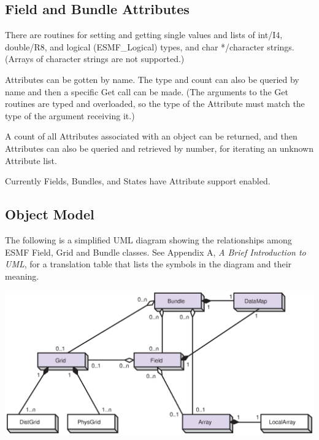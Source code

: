 \subsection{Field and Bundle Attributes}

There are routines for setting and getting single values and lists of
int/I4, double/R8, and logical (ESMF\_Logical) types, and char */character
strings.  (Arrays of character strings are not supported.)

Attributes can be gotten by name.  The type and count can also be queried
by name and then a specific Get call can be made.  (The arguments to the
Get routines are typed and overloaded, so the type of the Attribute must
match the type of the argument receiving it.)

A count of all Attributes associated with an object can be returned, and
then Attributes can also be queried and retrieved by number, for iterating
an unknown Attribute list.

Currently Fields, Bundles, and States have Attribute support enabled.

\newpage
\subsection{Object Model}

The following is a simplified UML diagram showing the relationships among
ESMF Field, Grid and Bundle classes.  See Appendix A, {\it A Brief 
Introduction to UML},
for a translation table that lists the symbols in the diagram and their 
meaning.

\begin{center}
\includegraphics{Bundle_obj.eps}   
\end{center}









